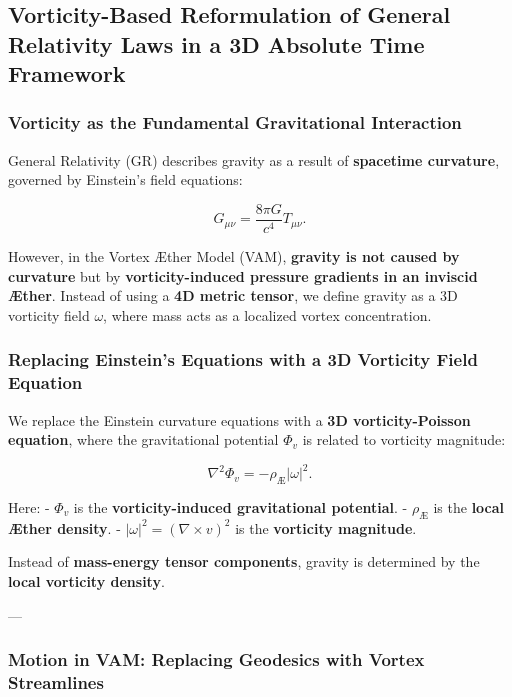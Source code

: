 
\subsection{Vorticity-Based Reformulation of General Relativity Laws in a 3D Absolute Time Framework}

\subsubsection*{Vorticity as the Fundamental Gravitational Interaction}

General Relativity (GR) describes gravity as a result of \textbf{spacetime curvature}, governed by Einstein’s field equations:

\begin{equation*}
    G_{\mu\nu} = \frac{8\pi G}{c^4} T_{\mu\nu}.
\end{equation*}

However, in the Vortex Æther Model (VAM), \textbf{gravity is not caused by curvature} but by \textbf{vorticity-induced pressure gradients in an inviscid Æther}. Instead of using a \textbf{4D metric tensor}, we define gravity as a 3D vorticity field \( \omega \), where mass acts as a localized vortex concentration.

\subsubsection*{Replacing Einstein’s Equations with a 3D Vorticity Field Equation}

We replace the Einstein curvature equations with a \textbf{3D vorticity-Poisson equation}, where the gravitational potential \( \Phi_v \) is related to vorticity magnitude:

\begin{equation*}
    \nabla^2 \Phi_v = - \rho_{\text{Æ}} |\omega|^2.
\end{equation*}

Here:
- \( \Phi_v \) is the \textbf{vorticity-induced gravitational potential}.
- \( \rho_{\text{Æ}} \) is the \textbf{local Æther density}.
- \( |\omega|^2 = (\nabla \times v)^2 \) is the \textbf{vorticity magnitude}.

Instead of \textbf{mass-energy tensor components}, gravity is determined by the \textbf{local vorticity density}.

---

\subsubsection*{Motion in VAM: Replacing Geodesics with Vortex Streamlines}

